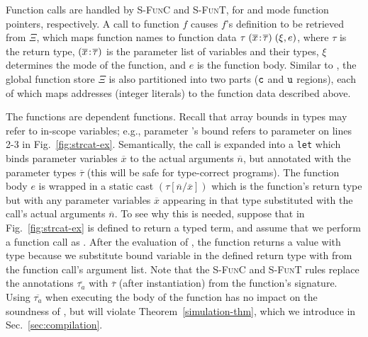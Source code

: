 Function calls are handled by \textsc{S-FunC} and \textsc{S-FunT},
for \cmode and \tmode mode function pointers, respectively. 
A call to function $f$ causes $f$'s
definition to be retrieved from $\Xi$,
which maps function names to
function data $\tau\;({\overline{x}}\!:\!{\overline{\tau}})\;(\xi,e)$, where
$\tau$ is the return type, $({\overline{x}}\!:\!{\overline{\tau}})$
is the parameter list of variables and their types, 
$\xi$ determines the mode of the function, and $e$ is the
function body. 
Similar to \heap, the global function store $\Xi$ is also partitioned into
two parts ($\texttt{c}$ and $\texttt{u}$ regions), each of which
maps addresses (integer literals) to the function data described above.

The \systemname functions are dependent functions.
Recall that array
bounds in types may refer to in-scope variables; e.g., parameter
's bound  refers to parameter  on lines
2-3 in Fig.~\ref{fig:strcat-ex}. 
Semantically,
the call is expanded into a \texttt{let} which binds
parameter variables $\overline{x}$ to the actual arguments
$\overline{n}$, but annotated with the parameter types
$\overline{\tau}$ (this will be safe for type-correct programs). The
function body $e$ is wrapped in a static cast
$(\tau[\overline{n} / \overline{x}])$ which is the function's return
type but with any parameter variables $\overline{x}$ appearing in that
type substituted with the call's actual arguments $\overline{n}$. To
see why this is needed, suppose that  in
Fig.~\ref{fig:strcat-ex} is defined to return a
 typed term, and assume that we
perform a  function call as
. After the evaluation of , the
function returns a value with type 
because we substitute bound variable  in the 
defined return type with  from the function call's
argument list.
Note that the \textsc{S-FunC} and \textsc{S-FunT} rules replace the
  annotations $\overline{\tau_a}$ with
  $\overline{\tau}$ (after instantiation) from the function's
  signature. Using $\overline{\tau_a}$ when executing the body of
the function has no impact on the soundness of \lang, but will violate
Theorem~\ref{simulation-thm}, which we introduce in Sec.~\ref{sec:compilation}.

